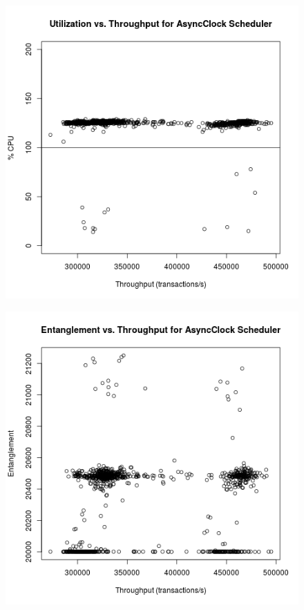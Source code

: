 \begin{figure}
\center
\includegraphics[width=\textwidth]{async_clock_throughput_utilization.png}
\caption{\label{async_clock_throughput_utilization}}
\end{figure}

\begin{figure}
\center
\includegraphics[width=\textwidth]{async_clock_throughput_entanglement.png}
\caption{\label{async_clock_throughput_entanglement}}
\end{figure}

